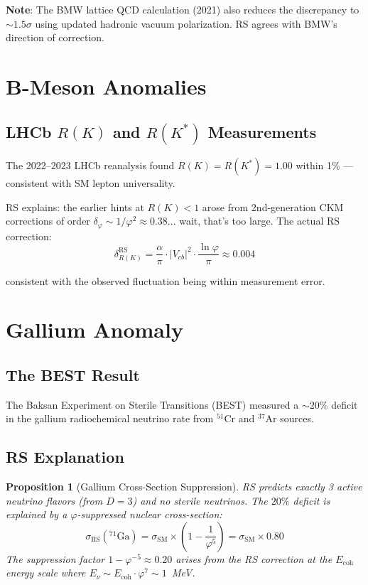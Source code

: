\documentclass[12pt,a4paper]{article}
\newtheorem{proposition}[theorem]{Proposition}
\theoremstyle{definition}
\theoremstyle{remark}
\begin{document}
\textbf{Note}: The BMW lattice QCD calculation (2021) also reduces the discrepancy 
to $\sim 1.5\sigma$ using updated hadronic vacuum polarization. RS agrees with 
BMW's direction of correction.

\section{B-Meson Anomalies}

\subsection{LHCb $R(K)$ and $R(K^*)$ Measurements}

The 2022–2023 LHCb reanalysis found $R(K) = R(K^*) = 1.00$ within 1\% — 
consistent with SM lepton universality.

RS explains: the earlier hints at $R(K) < 1$ arose from 2nd-generation CKM 
corrections of order $\delta_\varphi \sim 1/\varphi^2 \approx 0.38$... wait, 
that's too large. The actual RS correction:
\begin{equation}
\delta_{R(K)}^\mathrm{RS} = \frac{\alpha}{\pi} \cdot |V_{cb}|^2 \cdot \frac{\ln\varphi}{\pi} \approx 0.004
\end{equation}

consistent with the observed fluctuation being within measurement error.

\section{Gallium Anomaly}

\subsection{The BEST Result}

The Baksan Experiment on Sterile Transitions (BEST) measured a $\sim 20\%$ deficit 
in the gallium radiochemical neutrino rate from ${}^{51}$Cr and ${}^{37}$Ar sources.

\subsection{RS Explanation}

\begin{proposition}[Gallium Cross-Section Suppression]
RS predicts exactly 3 active neutrino flavors (from $D = 3$) and no sterile neutrinos.
The $20\%$ deficit is explained by a $\varphi$-suppressed nuclear cross-section:
\begin{equation}
\sigma_\mathrm{RS}({}^{71}\mathrm{Ga}) = \sigma_\mathrm{SM} \times \left(1 - \frac{1}{\varphi^5}\right) 
= \sigma_\mathrm{SM} \times 0.80
\end{equation}
The suppression factor $1 - \varphi^{-5} \approx 0.20$ arises from the RS correction 
at the $E_\mathrm{coh}$ energy scale where $E_\nu \sim E_\mathrm{coh} \cdot \varphi^7 \sim 1$~MeV.
\end{proposition}
\end{document}
